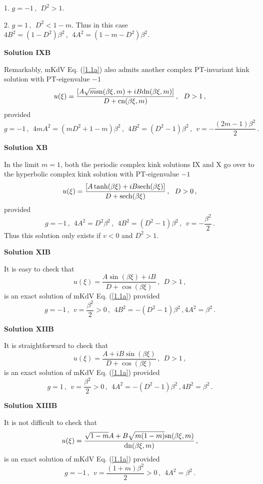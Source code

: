\documentclass[11pt]{article}
\newcommand{\be}{\begin{equation}}
\newcommand{\ee}{\end{equation}}
\newcommand{\sn}{{\rm sn}}
\newcommand{\dn}{{\rm dn}}
\newcommand{\cn}{{\rm cn}}
\newcommand{\sech}{{\rm sech}}
\begin{document}
1. $g = -1\,,~~ D^2 > 1$. 

2. $g = 1\,,~~D^2 < 1-m$. Thus in this case $4B^2 = (1-D^2)\beta^2\,,
~~4A^2 = (1-m-D^2)\beta^2$.

{\bf Solution IXB}

Remarkably, mKdV Eq. (\ref{1.1a}) also admits another complex PT-invariant 
kink solution with PT-eigenvalue $-1$
\be\label{B20}
u(\xi) = \frac{[A\sqrt{m} \sn(\beta \xi,m)+iB \dn(\beta \xi,m)]}
{D+\cn(\beta \xi,m)}\,,~~D > 1\,,
\ee
provided
\be\label{B21}
g = -1\,,~~4m A^2 = (mD^2+1-m) \beta^2\,,~~4 B^2 = (D^2-1)\beta^2\,,~~
v = -\frac{(2m-1)\beta^2}{2}\,.
\ee

{\bf Solution XB}

In the limit $m = 1$, both the periodic complex kink solutions IX and X
go over to the hyperbolic complex kink solution with PT-eigenvalue $-1$
\be\label{B22}
u(\xi) = \frac{[A\tanh(\beta \xi)+iB\sech(\beta \xi)]}{D+\sech(\beta \xi)}\,,
~~D > 0\,,
\ee
provided
\be\label{B23}
g=-1\,,~~4 A^2 = D^2 \beta^2\,,~~4 B^2 = (D^2-1)\beta^2\,,~~
v = -\frac{\beta^2}{2}\,.
\ee
Thus this solution only exists if $v < 0$ and $D^2 > 1$. 

{\bf Solution XIB}

It is easy to check that
\be\label{B24}
u(\xi) = \frac{A\sin(\beta \xi)+iB}{D+\cos(\beta \xi)}\,,~~D > 1\,,
\ee
is an exact solution of mKdV Eq. (\ref{1.1a}) provided 
\be\label{B25}
g = -1\,,~~v = \frac{\beta^2}{2} > 0\,,~~4B^2 =-(D^2-1)\beta^2\,,
4 A^2 = \beta^2\,.
\ee

{\bf Solution XIIB}

It is straightforward to check that
\be\label{B26}
u(\xi) = \frac{A+iB\sin(\beta \xi)}{D+\cos(\beta \xi)}\,,~~D > 1\,,
\ee
is an exact solution of mKdV Eq. (\ref{1.1a}) provided 
\be\label{B27}
g = 1\,,~~v = \frac{\beta^2}{2} > 0\,,~~4 A^2 =-(D^2-1)\beta^2\,,
4 B^2 = \beta^2\,.
\ee

{\bf Solution XIIIB}

It is not difficult to check that
\be\label{B28}
u(\xi) = \frac{\sqrt{1-m} A+B \sqrt{m(1-m)}\sn(\beta \xi,m)}
{\dn(\beta \xi, m)}\,,
\ee
is an exact solution of mKdV Eq. (\ref{1.1a}) provided 
\be\label{B29}
g = -1\,,~~v = \frac{(1+m)\beta^2}{2} > 0\,,~~4 A^2 = \beta^2\,.
\ee
\end{document}
